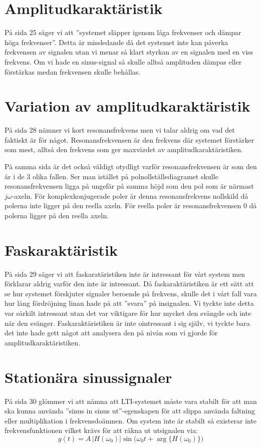 \documentclass[usenames,dvipsnames]{article}
\begin{document}
\section{Amplitudkaraktäristik}
På sida 25 säger vi att ''systemet släpper igenom låga frekvenser och dämpar höga frekvenser''. Detta är missledande då det systemet inte kan påverka frekvensen av signalen utan vi menar så klart styrkan av en signalen med en viss frekvens. Om vi hade en sinus-signal så skulle alltså amplituden dämpas eller förstärkas medan frekvensen skulle behållas.

\section{Variation av amplitudkaraktäristik}
På sida 28 nämner vi kort resonansfrekvens men vi talar aldrig om vad det faktiskt är för något. Resonansfrekvensen är den frekvens där systemet förstärker som mest, alltså den frekvens som ger maxvärdet av amplitudkaraktäristiken.

På samma sida är det också väldigt otydligt varför resonansfrekvensen är som den är i de 3 olika fallen.
Ser man istället på polnollställediagramet skulle resonansfrekvensen ligga på ungefär på samma höjd som den pol som är närmast $j\omega$-axeln. För komplexkonjugerade poler är denna resonansfrekvens nollskild då polerna inte ligger på den reella axeln. För reella poler är resonansfrekvensen $0$ då polerna ligger på den reella axeln.

\section{Faskaraktäristik}
På sida 29 säger vi att faskaratäristiken inte är intressant för vårt system men förklarar aldrig varför den inte är intressant. Då faskaraktäristiken är ett sätt att se hur systemet förskjuter signaler beroende på frekvens, skulle det i vårt fall vara hur lång fördröjning linan hade på att ''svara'' på insignalen. Vi tyckte inte detta var särkilt intressant utan det var viktigare för hur mycket den svängde och inte när den svänger. Faskaraktäristiken är inte ointressant i sig själv, vi tyckte bara det inte hade gett något att analysera den på nivån som vi gjorde för amplitudkaraktäristiken.

\section{Stationära sinussignaler}
På sida 30 glömmer vi att nämna att LTI-systemet måste vara stabilt för att man ska kunna använda ''sinus in sinus ut''-egenskapen för att slippa använda faltning eller multiplikation i frekvensdoämnen. Om system inte är stabilt så existerar inte frekvensfunktionen vilket krävs för att räkna ut utsignalen via: $$y(t)=A\,\big|H(\omega_0)\big|\sin\big(\omega_0t+\arg\big\{H(\omega_0)\big\}\big)$$
\end{document}
